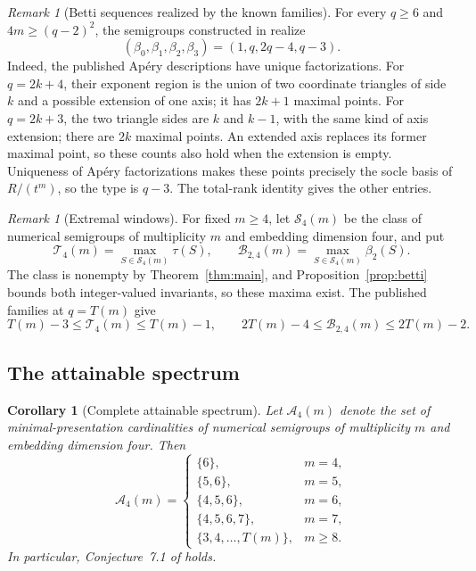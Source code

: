 \documentclass[11pt]{article}
\newtheorem{corollary}[theorem]{Corollary}
\theoremstyle{definition}
\theoremstyle{remark}
\newtheorem{remark}[theorem]{Remark}
\theoremstyle{plain}
\begin{document}
\begin{remark}[Betti sequences realized by the known families]\label{rem:betti-family}
For every $q\ge6$ and $4m\ge(q-2)^2$, the semigroups constructed in
\cite[Theorem~6.3]{EHOOPK24} realize
\[
(\beta_0,\beta_1,\beta_2,\beta_3)=(1,q,2q-4,q-3).
\]
Indeed, the published Ap\'ery descriptions have unique factorizations.
For $q=2k+4$, their exponent region is the union of two coordinate
triangles of side $k$ and a possible extension of one axis; it has
$2k+1$ maximal points.  For $q=2k+3$, the two triangle sides are $k$
and $k-1$, with the same kind of axis extension; there are $2k$
maximal points. An extended axis replaces its former maximal point, so these counts also hold when the extension is empty. Uniqueness of Ap\'ery factorizations makes these
points precisely the socle basis of $R/(t^m)$, so the type is $q-3$.
The total-rank identity gives the other entries.
\end{remark}

\begin{remark}[Extremal windows]\label{rem:extremal-windows}
For fixed \(m\ge4\), let \(\mathcal S_4(m)\) be the class of numerical
semigroups of multiplicity \(m\) and embedding dimension four, and put
\[
\mathcal T_4(m)=\max_{S\in\mathcal S_4(m)}\tau(S),
\qquad
\mathcal B_{2,4}(m)=\max_{S\in\mathcal S_4(m)}\beta_2(S).
\]
The class is nonempty by Theorem~\ref{thm:main}, and
Proposition~\ref{prop:betti} bounds both integer-valued invariants, so
these maxima exist. The published families at \(q=T(m)\) give
\[
T(m)-3\le\mathcal T_4(m)\le T(m)-1,
\qquad
2T(m)-4\le\mathcal B_{2,4}(m)\le2T(m)-2.
\]
\end{remark}

\subsection{The attainable spectrum}
\medskip
\begin{corollary}[Complete attainable spectrum]\label{cor:spectrum}
Let \(\mathcal A_4(m)\) denote the set of minimal-presentation cardinalities
of numerical semigroups of multiplicity \(m\) and embedding dimension four.
Then
\[
\mathcal A_4(m)=
\begin{cases}
\{6\},&m=4,\\
\{5,6\},&m=5,\\
\{4,5,6\},&m=6,\\
\{4,5,6,7\},&m=7,\\
\{3,4,\ldots,T(m)\},&m\ge8.
\end{cases}
\]
In particular, Conjecture~7.1 of \cite{EHOOPK24} holds.\end{corollary}
\end{document}
